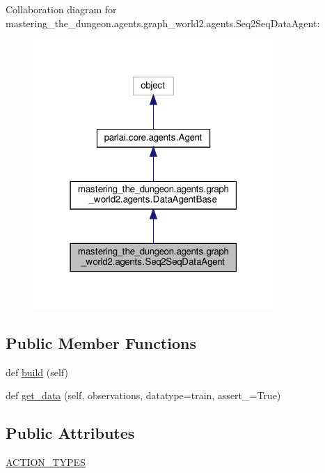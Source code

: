 Collaboration diagram for mastering\+\_\+the\+\_\+dungeon.\+agents.\+graph\+\_\+world2.\+agents.\+Seq2\+Seq\+Data\+Agent\+:
\nopagebreak
\begin{figure}[H]
\begin{center}
\leavevmode
\includegraphics[width=259pt]{classmastering__the__dungeon_1_1agents_1_1graph__world2_1_1agents_1_1Seq2SeqDataAgent__coll__graph}
\end{center}
\end{figure}
\subsection*{Public Member Functions}
\begin{DoxyCompactItemize}
\item 
def \hyperlink{classmastering__the__dungeon_1_1agents_1_1graph__world2_1_1agents_1_1Seq2SeqDataAgent_a080e6e398830278d44793a7c5c123de6}{build} (self)
\item 
def \hyperlink{classmastering__the__dungeon_1_1agents_1_1graph__world2_1_1agents_1_1Seq2SeqDataAgent_ac9ab565d0ad3c6ca1fe7c692b8e04f69}{get\+\_\+data} (self, observations, datatype=\textquotesingle{}train\textquotesingle{}, assert\+\_\+=True)
\end{DoxyCompactItemize}
\subsection*{Public Attributes}
\begin{DoxyCompactItemize}
\item 
\hyperlink{classmastering__the__dungeon_1_1agents_1_1graph__world2_1_1agents_1_1Seq2SeqDataAgent_a10ea17b4001b79f32384eb2689deb851}{A\+C\+T\+I\+O\+N\+\_\+\+T\+Y\+P\+ES}
\end{DoxyCompactItemize}


